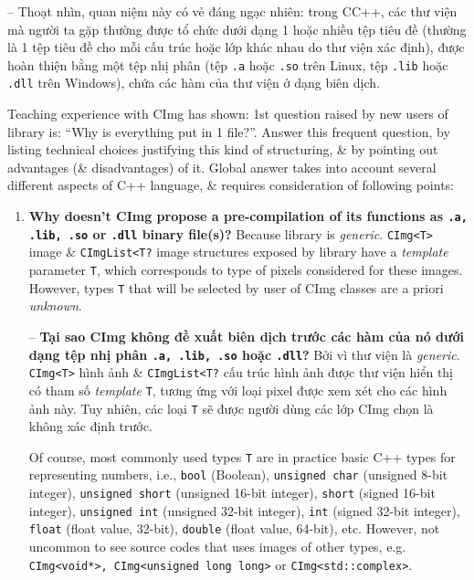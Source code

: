 \documentclass{article}
\begin{document}
\begin{itemize}
\begin{itemize}
        -- Thoạt nhìn, quan niệm này có vẻ đáng ngạc nhiên: trong C{\tt}C++, các thư viện mà người ta gặp thường được tổ chức dưới dạng 1 hoặc nhiều tệp tiêu đề (thường là 1 tệp tiêu đề cho mỗi cấu trúc hoặc lớp khác nhau do thư viện xác định), được hoàn thiện bằng một tệp nhị phân (tệp {\tt.a} hoặc {\tt.so} trên Linux, tệp {\tt.lib} hoặc {\tt.dll} trên Windows), chứa các hàm của thư viện ở dạng biên dịch.
        
        Teaching experience with CImg has shown: 1st question raised by new users of library is: ``Why is everything put in 1 file?''. Answer this frequent question, by listing technical choices justifying this kind of structuring, \& by pointing out advantages (\& disadvantages) of it. Global answer takes into account several different aspects of C++ language, \& requires consideration of following points:
        \begin{enumerate}
            \item {\bf Why doesn't CImg propose a pre-compilation of its functions as {\tt.a, .lib, .so} or {\tt.dll} binary file(s)?} Because library is {\it generic}. {\tt CImg<T>} image \& {\tt CImgList<T?} image structures exposed by library have a {\it template} parameter {\tt T}, which corresponds to type of pixels considered for these images. However, types {\tt T} that will be selected by user of CImg classes are a priori {\it unknown}.
            
            -- {\bf Tại sao CImg không đề xuất biên dịch trước các hàm của nó dưới dạng tệp nhị phân {\tt.a, .lib, .so} hoặc {\tt.dll}?} Bởi vì thư viện là {\it generic}. {\tt CImg<T>} hình ảnh \& {\tt CImgList<T?} cấu trúc hình ảnh được thư viện hiển thị có tham số {\it template} {\tt T}, tương ứng với loại pixel được xem xét cho các hình ảnh này. Tuy nhiên, các loại {\tt T} sẽ được người dùng các lớp CImg chọn là không xác định trước.
            
            Of course, most commonly used types {\tt T} are in practice basic C++ types for representing numbers, i.e., {\tt bool} (Boolean), {\tt unsigned char} (unsigned 8-bit integer), {\tt unsigned short} (unsigned 16-bit integer), {\tt short} (signed 16-bit integer), {\tt unsigned int} (unsigned 32-bit integer), {\tt int} (signed 32-bit integer), {\tt float} (float value, 32-bit), {\tt double} (float value, 64-bit), etc. However, not uncommon to see source codes that uses images of other types, e.g. {\tt CImg<void*>, CImg<unsigned long long>} or {\tt CImg<std::complex>}.
            

\end{enumerate}
\end{itemize}
\end{itemize}
\end{document}
